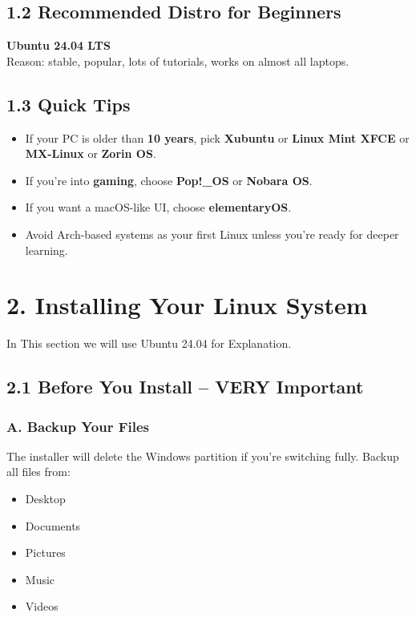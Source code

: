 \documentclass[12pt]{article}
\begin{document}
\subsection*{1.2 Recommended Distro for Beginners}

\begin{highlightbox}
\textbf{Ubuntu 24.04 LTS}\\
Reason: stable, popular, lots of tutorials, works on almost all laptops.
\end{highlightbox}

\subsection*{1.3 Quick Tips}

\begin{itemize}
    \item If your PC is older than \textbf{10 years}, pick \textbf{Xubuntu} or \textbf{Linux Mint XFCE} or \textbf{MX-Linux} or \textbf{Zorin OS}.
    \item If you're into \textbf{gaming}, choose \textbf{Pop!\_OS} or \textbf{Nobara OS}.
    \item If you want a macOS-like UI, choose \textbf{elementaryOS}.
    \item Avoid Arch-based systems as your first Linux unless you're ready for deeper learning.
\end{itemize}

\section*{2. Installing Your Linux System}

In This section we will use Ubuntu 24.04 for Explanation.

\subsection*{2.1 Before You Install – VERY Important}

\subsubsection*{A. Backup Your Files}

The installer will delete the Windows partition if you're switching fully.
Backup all files from:

\begin{itemize}
    \item Desktop
    \item Documents
    \item Pictures
    \item Music
    \item Videos
\end{itemize}
\end{document}
